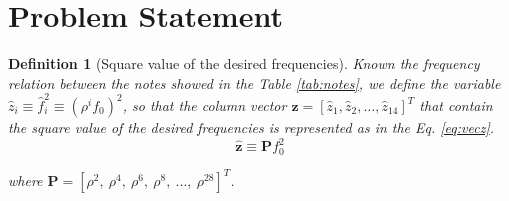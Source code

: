 \documentclass{article}
\newtheorem{mydef}{Definition}[section]
\begin{document}
\section{Problem Statement}


\begin{mydef}[Square value of the desired frequencies]
Known the frequency relation between the notes showed in the Table \ref{tab:notes}, 
we define the variable $\hat{z}_i\equiv \hat{f}_i^2 \equiv \left( {\rho}^{i} f_0 \right)^{2} $,
so that the  column vector $\mathbf{\hat{z}}= \left[ \hat{z}_1, \hat{z}_2, \hdots, \hat{z}_{14}\right]^{T} $ 
that contain the square value of the desired frequencies
is represented as in the Eq. \ref{eq:vecz}.
\begin{equation} \label{eq:vecz}
\mathbf{\hat{z}}
\equiv \mathbf{P} f_{0}^2
\end{equation}

where $\mathbf{P}=[\rho^2,~\rho^4,~\rho^6,~\rho^8,~...,~\rho^{28}]^T$.

\end{mydef}
\end{document}
